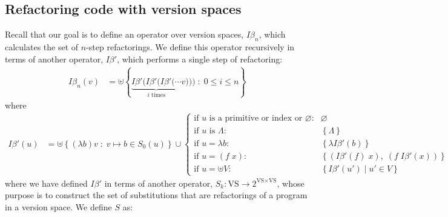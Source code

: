 \documentclass{article}
\begin{document}
\subsection{Refactoring code with version spaces}\label{appendixVersion}
Recall that our goal is to define an operator over version spaces, $I\beta_n$,
which calculates the set of $n$-step refactorings.
We define this operator recursively in terms of another operator, $I\beta'$, which performs a single step of refactoring:
\begin{align*}
  I\beta_n(v)& = \uplus \left\{ \underbrace{I\beta'(I\beta'(I\beta'(\cdots}_{i \text{ times}} v))) \;:\; 0\leq i \leq n \right\}
\end{align*}
where
  \begin{align*}
    I\beta'(u)& = \uplus \left\{(\lambda b)v\;:\;v\mapsto b\in S_0(u)%
    \right\}\cup
  \begin{cases}
    \text{if $u$ is a primitive or index or $\varnothing $:}&\varnothing\\
    \text{if $u$ is $\Lambda$:}&\left\{\Lambda \right\}\\
    \text{if $u = \lambda b$:}&\left\{\lambda I\beta'(b) \right\}\\
    \text{if $u = (f\;x)$:}&\left\{(I\beta'(f)\;x),\;(f\;I\beta'(x)) \right\}\\
    \text{if $u = \uplus V$:}&\left\{I\beta'(u')\;|\;u'\in V \right\}
  \end{cases}  
  \end{align*}
  where we have defined $I\beta'$
  in terms of another operator, $S_k:\text{VS}\to 2^{\text{VS}\times\text{VS}}$,
  whose purpose is to construct the set of
  substitutions that are refactorings of a program in a version space.
We define $S$ as:
\end{document}
